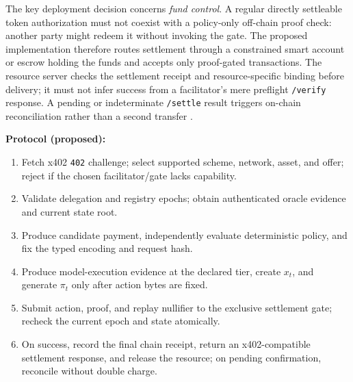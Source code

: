 \documentclass[conference]{IEEEtran}
\begin{document}
The key deployment decision concerns \emph{fund control}. A regular directly settleable token authorization must not coexist with a policy-only off-chain proof check: another party might redeem it without invoking the gate. The proposed implementation therefore routes settlement through a constrained smart account or escrow holding the funds and accepts only proof-gated transactions. The resource server checks the settlement receipt and resource-specific binding before delivery; it must not infer success from a facilitator's mere preflight \texttt{/verify} response. A pending or indeterminate \texttt{/settle} result triggers on-chain reconciliation rather than a second transfer \cite{x402fac}.

\noindent\textbf{Protocol (proposed):}
\begin{enumerate}[leftmargin=*,nosep]
\item Fetch x402 \texttt{402} challenge; select supported scheme, network, asset, and offer; reject if the chosen facilitator/gate lacks capability.
\item Validate delegation and registry epochs; obtain authenticated oracle evidence and current state root.
\item Produce candidate payment, independently evaluate deterministic policy, and fix the typed encoding and request hash.
\item Produce model-execution evidence at the declared tier, create \(x_t\), and generate \(\pi_t\) only after action bytes are fixed.
\item Submit action, proof, and replay nullifier to the exclusive settlement gate; recheck the current epoch and state atomically.
\item On success, record the final chain receipt, return an x402-compatible settlement response, and release the resource; on pending confirmation, reconcile without double charge.
\end{enumerate}
\end{document}
